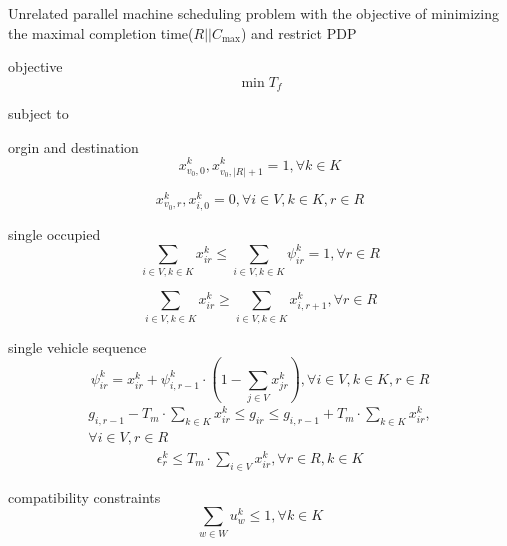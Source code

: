 \documentclass[preprint,12pt,authoryear]{elsarticle}
\begin{document}
Unrelated parallel machine scheduling problem with the objective of 
minimizing the maximal completion time($R||C_{\max}$) and restrict PDP

objective
\begin{equation}
    \min T_f
\label{msobj}
\end{equation}

subject to

orgin and destination
\begin{equation}
    x_{v_0,0}^k,x_{v_0,|R|+1}^k=1,\forall k\in K 
\label{od}
\end{equation}

\begin{equation}
    x_{v_0,r}^k,x_{i,0}^k=0,\forall i\in V, k\in K,r\in R 
\label{dpt}
\end{equation}

single occupied
\begin{equation}
    \sum_{i\in V,k\in K}{x_{ir}^k}\leq \sum_{i\in V,k\in K}{\psi_{ir}^k}= 1, \forall r\in R
\label{so}
\end{equation}

\begin{equation}
    \sum_{i\in V,k\in K}{x_{ir}^k}\geq \sum_{i\in V,k\in K}{x_{i,r+1}^k}, \forall r\in R
\label{zeroafter}
\end{equation}

single vehicle sequence
\begin{equation}
    \psi_{ir}^k=x_{ir}^k+\psi_{i,r-1}^k
    \cdot (1-\sum_{j\in V}{x_{jr}^k}),\forall i\in V,k\in K,r\in R
\label{svs}
\end{equation}
\begin{equation}
    \begin{split}
        g_{i,r-1}-T_m\cdot \sum_{k\in K}{x_{ir}^k} \leq g_{ir}
        \leq g_{i,r-1}+T_m\cdot \sum_{k\in K}{x_{ir}^k},\\
        \forall i\in V ,r\in R
    \end{split}
\label{god}
\end{equation}
\begin{equation}
    \begin{split}
        \epsilon_r^k \leq T_m\cdot \sum_{i\in V}{x_{ir}^k},
        \forall r\in R,k\in K
    \end{split}
\label{eod}
\end{equation}

compatibility constraints
\begin{equation}
    \sum_{w\in W}{u_w^k}\leq 1, \forall k\in K
\label{scc}
\end{equation}
\end{document}
